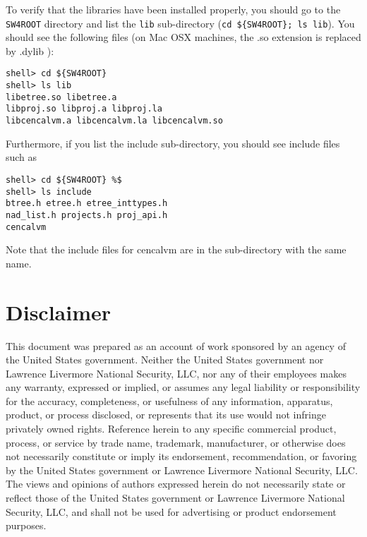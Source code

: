 \documentclass[11pt]{article}
\begin{document}
To verify that the libraries have been installed properly, you should go to the \verb+SW4ROOT+
directory and list the {\tt lib} sub-directory (\verb+cd ${SW4ROOT}; ls lib+). You should see the
following files (on Mac OSX machines, the .so extension is replaced by .dylib ):
\begin{verbatim}
shell> cd ${SW4ROOT}
shell> ls lib
libetree.so libetree.a
libproj.so libproj.a libproj.la
libcencalvm.a libcencalvm.la libcencalvm.so
\end{verbatim}
Furthermore, if you list the include sub-directory, you should see include files such as
\begin{verbatim}
shell> cd ${SW4ROOT} %$
shell> ls include
btree.h etree.h etree_inttypes.h
nad_list.h projects.h proj_api.h
cencalvm
\end{verbatim}
Note that the include files for cencalvm are in the sub-directory with the same name.

\section{Disclaimer}
This document was prepared as an account of work sponsored by an agency of the United States
government. Neither the United States government nor Lawrence Livermore National Security, LLC, nor
any of their employees makes any warranty, expressed or implied, or assumes any legal liability or
responsibility for the accuracy, completeness, or usefulness of any information, apparatus, product,
or process disclosed, or represents that its use would not infringe privately owned
rights. Reference herein to any specific commercial product, process, or service by trade name,
trademark, manufacturer, or otherwise does not necessarily constitute or imply its endorsement,
recommendation, or favoring by the United States government or Lawrence Livermore National Security,
LLC. The views and opinions of authors expressed herein do not necessarily state or reflect those of
the United States government or Lawrence Livermore National Security, LLC, and shall not be used for
advertising or product endorsement purposes.




\end{document}
